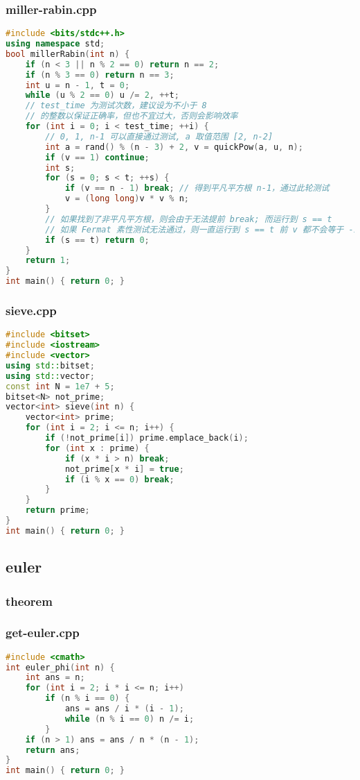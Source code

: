 \documentclass[9pt, a4paper, oneside]{book}
\begin{document}
\subsubsection{miller-rabin.cpp}
\begin{lstlisting}[language={C++}]
#include <bits/stdc++.h>
using namespace std;
bool millerRabin(int n) {
    if (n < 3 || n % 2 == 0) return n == 2;
    if (n % 3 == 0) return n == 3;
    int u = n - 1, t = 0;
    while (u % 2 == 0) u /= 2, ++t;
    // test_time 为测试次数，建议设为不小于 8
    // 的整数以保证正确率，但也不宜过大，否则会影响效率
    for (int i = 0; i < test_time; ++i) {
        // 0, 1, n-1 可以直接通过测试, a 取值范围 [2, n-2]
        int a = rand() % (n - 3) + 2, v = quickPow(a, u, n);
        if (v == 1) continue;
        int s;
        for (s = 0; s < t; ++s) {
            if (v == n - 1) break; // 得到平凡平方根 n-1，通过此轮测试
            v = (long long)v * v % n;
        }
        // 如果找到了非平凡平方根，则会由于无法提前 break; 而运行到 s == t
        // 如果 Fermat 素性测试无法通过，则一直运行到 s == t 前 v 都不会等于 -1
        if (s == t) return 0;
    }
    return 1;
}
int main() { return 0; }\end{lstlisting}
\subsubsection{sieve.cpp}
\begin{lstlisting}[language={C++}]
#include <bitset>
#include <iostream>
#include <vector>
using std::bitset;
using std::vector;
const int N = 1e7 + 5;
bitset<N> not_prime;
vector<int> sieve(int n) {
    vector<int> prime;
    for (int i = 2; i <= n; i++) {
        if (!not_prime[i]) prime.emplace_back(i);
        for (int x : prime) {
            if (x * i > n) break;
            not_prime[x * i] = true;
            if (i % x == 0) break;
        }
    }
    return prime;
}
int main() { return 0; }\end{lstlisting}
\subsection{euler}
\subsubsection{theorem}
\subsubsection{get-euler.cpp}
\begin{lstlisting}[language={C++}]
#include <cmath>
int euler_phi(int n) {
    int ans = n;
    for (int i = 2; i * i <= n; i++)
        if (n % i == 0) {
            ans = ans / i * (i - 1);
            while (n % i == 0) n /= i;
        }
    if (n > 1) ans = ans / n * (n - 1);
    return ans;
}
int main() { return 0; }\end{lstlisting}
\end{document}
